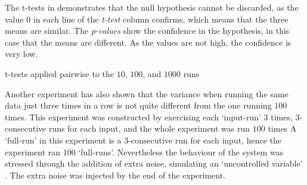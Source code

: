 The t-tests in  demonstrates that the null hypothesis cannot be discarded, as the value $0$ in each line of the \emph{t-test} column confirms, which means that the three means are similar. The \emph{p-values} show the confidence in the hypothesis, in this case that the means are different. As the values are not high, the confidence is very low.

\begin{table}
  \centering
  \begin{tiny}
  
  \end{tiny}
  \caption{t-tests applied pairwise to the $10$, $100$, and $1000$ runs}
  \label{tab:ttest}
\end{table}


Another experiment has also shown that the variance when running the same data just three times in a row is not quite different from the one running $100$ times. This experiment was constructed by exercising each `input-run' $3$ times, $3$-consecutive runs for each input, and the whole experiment was run $100$ times%
A `full-run' in this experiment is a $3$-consecutive run for each input, hence the experiment ran $100$ `full-runs'. Nevertheless the behaviour of the system was stressed through the addition of extra noise, simulating an `uncontrolled variable' \cite{Kalibera2013}. The extra noise was injected by the end of the experiment.

